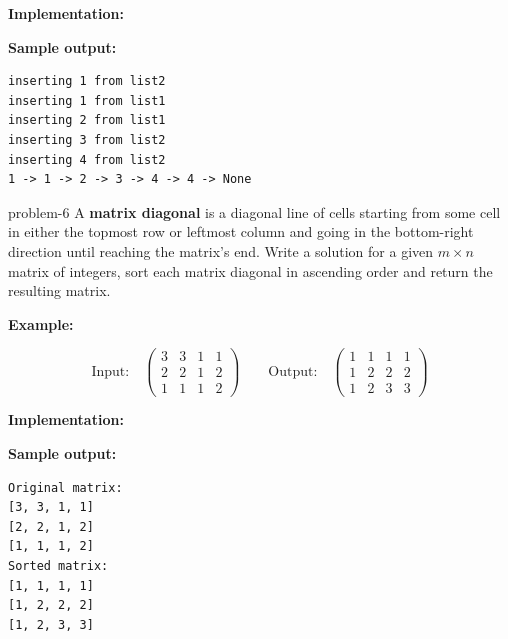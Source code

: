 \documentclass[letterpaper, 11pt]{extarticle}
\begin{document}
\vspace{1ex}
\noindent\textbf{Implementation:}


\vspace{0.5ex}
\noindent\textbf{Sample output:}
\begin{lstlisting}[numbers=none, frame=single, basicstyle=\ttfamily\small]
inserting 1 from list2
inserting 1 from list1
inserting 2 from list1
inserting 3 from list2
inserting 4 from list2
1 -> 1 -> 2 -> 3 -> 4 -> 4 -> None
\end{lstlisting}


\begin{problem}{}{problem-6}
    A \textbf{matrix diagonal} is a diagonal line of cells starting from some cell in either the topmost row or leftmost column and going in the bottom-right direction until reaching the matrix's end. Write a solution for a given $m \times n$ matrix of integers, sort each matrix diagonal in ascending order and return the resulting matrix.

    \vspace{1ex}
    \noindent\textbf{Example:}

    \[
    \text{Input:}
    \quad
    \begin{pmatrix}
    3 & 3 & 1 & 1 \\
    2 & 2 & 1 & 2 \\
    1 & 1 & 1 & 2
    \end{pmatrix}
    \qquad
    \text{Output:}
    \quad
    \begin{pmatrix}
    1 & 1 & 1 & 1 \\
    1 & 2 & 2 & 2 \\
    1 & 2 & 3 & 3
    \end{pmatrix}
    \]
\end{problem}

\vspace{1ex}
\noindent\textbf{Implementation:}


\vspace{0.5ex}
\noindent\textbf{Sample output:}
\begin{lstlisting}[numbers=none, frame=single, basicstyle=\ttfamily\small]
Original matrix:
[3, 3, 1, 1]
[2, 2, 1, 2]
[1, 1, 1, 2]
Sorted matrix:
[1, 1, 1, 1]
[1, 2, 2, 2]
[1, 2, 3, 3]
\end{lstlisting}
\end{document}
